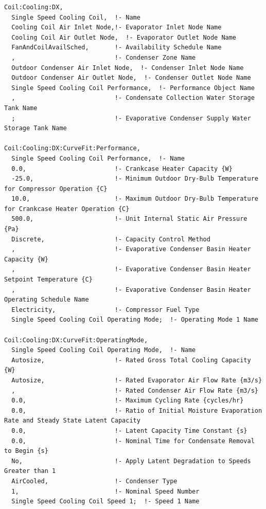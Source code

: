 \begin{lstlisting}
Coil:Cooling:DX,
  Single Speed Cooling Coil,  !- Name
  Cooling Coil Air Inlet Node,!- Evaporator Inlet Node Name
  Cooling Coil Air Outlet Node,  !- Evaporator Outlet Node Name
  FanAndCoilAvailSched,       !- Availability Schedule Name
  ,                           !- Condenser Zone Name
  Outdoor Condenser Air Inlet Node,  !- Condenser Inlet Node Name
  Outdoor Condenser Air Outlet Node,  !- Condenser Outlet Node Name
  Single Speed Cooling Coil Performance,  !- Performance Object Name
  ,                           !- Condensate Collection Water Storage Tank Name
  ;                           !- Evaporative Condenser Supply Water Storage Tank Name

Coil:Cooling:DX:CurveFit:Performance,
  Single Speed Cooling Coil Performance,  !- Name
  0.0,                        !- Crankcase Heater Capacity {W}
  -25.0,                      !- Minimum Outdoor Dry-Bulb Temperature for Compressor Operation {C}
  10.0,                       !- Maximum Outdoor Dry-Bulb Temperature for Crankcase Heater Operation {C}
  500.0,                      !- Unit Internal Static Air Pressure {Pa}
  Discrete,                   !- Capacity Control Method
  ,                           !- Evaporative Condenser Basin Heater Capacity {W}
  ,                           !- Evaporative Condenser Basin Heater Setpoint Temperature {C}
  ,                           !- Evaporative Condenser Basin Heater Operating Schedule Name
  Electricity,                !- Compressor Fuel Type
  Single Speed Cooling Coil Operating Mode;  !- Operating Mode 1 Name

Coil:Cooling:DX:CurveFit:OperatingMode,
  Single Speed Cooling Coil Operating Mode,  !- Name
  Autosize,                   !- Rated Gross Total Cooling Capacity {W}
  Autosize,                   !- Rated Evaporator Air Flow Rate {m3/s}
  ,                           !- Rated Condenser Air Flow Rate {m3/s}
  0.0,                        !- Maximum Cycling Rate {cycles/hr}
  0.0,                        !- Ratio of Initial Moisture Evaporation Rate and Steady State Latent Capacity
  0.0,                        !- Latent Capacity Time Constant {s}
  0.0,                        !- Nominal Time for Condensate Removal to Begin {s}
  No,                         !- Apply Latent Degradation to Speeds Greater than 1
  AirCooled,                  !- Condenser Type
  1,                          !- Nominal Speed Number
  Single Speed Cooling Coil Speed 1;  !- Speed 1 Name


\end{lstlisting}
